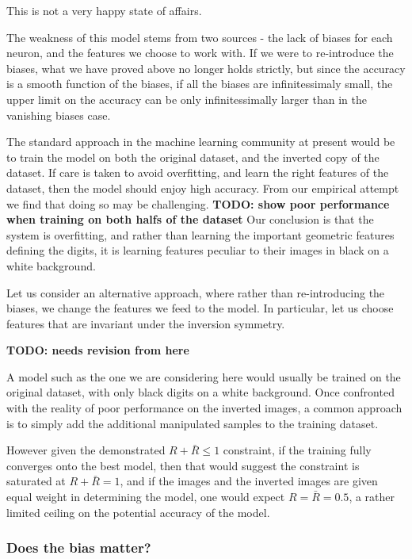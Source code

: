 \documentclass[twocolumn, prl]{revtex4-1}
\begin{document}
This is not a very happy state of affairs. 

The weakness of this model stems from two sources - the lack of biases for each neuron, and the features we choose to work with. If we were to re-introduce the biases, what we have proved above no longer holds strictly, but since the accuracy is a smooth function of the biases, if all the biases are infinitessimaly small, the upper limit on the accuracy can be only infinitessimally larger than in the vanishing biases case.

The standard approach in the machine learning community at present would be to train the model on both the original dataset, and the inverted copy of the dataset. If care is taken to avoid overfitting, and learn the right features of the dataset, then the model should enjoy high accuracy. From our empirical attempt we find that doing so may be challenging.
{\bf TODO: show poor performance when training on both halfs of the dataset}
Our conclusion is that the system is overfitting, and rather than learning the important geometric features defining the digits, it is learning features peculiar to their images in black on a white background.

Let us consider an alternative approach, where rather than re-introducing the biases, we change the features we feed to the model. In particular, let us choose features that are invariant under the inversion symmetry.

{\bf TODO: needs revision from here}

A model such as the one we are considering here would usually be trained on the original dataset, with only black digits on a white background. Once confronted with the reality of poor performance on the inverted images, a common approach is to simply add the additional manipulated samples to the training dataset.

However given the demonstrated $R + {\bar R} \leq 1$ constraint, if the training fully converges onto the best model, then that would suggest 
the constraint is saturated at $R + {\bar R} = 1$, and if the images and the inverted images are given equal weight in determining the model, one would expect $R = {\bar R} = 0.5$, a rather limited ceiling on the potential accuracy of the model.

\subsubsection{Does the bias matter?}
\end{document}
